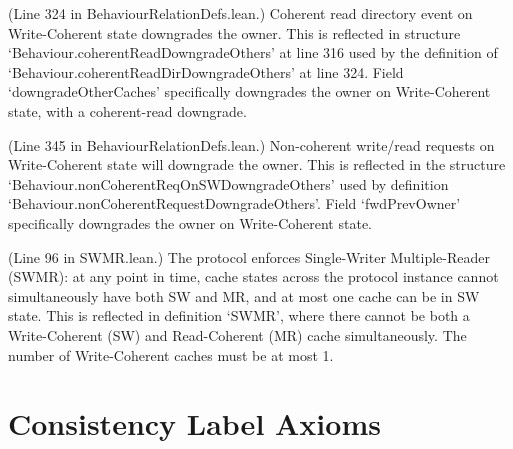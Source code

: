 \begin{definition}
  \label{def:coherentReadDirDowngradeOthers}
  \leanok
  (Line 324 in BehaviourRelationDefs.lean.)
  Coherent read directory event on Write-Coherent state downgrades the owner.
  This is reflected in structure `Behaviour.coherentReadDowngradeOthers' at line 316 used by
  the definition of `Behaviour.coherentReadDirDowngradeOthers' at line 324.
  Field `downgradeOtherCaches' specifically downgrades the owner on Write-Coherent state,
  with a coherent-read downgrade.
\end{definition}

\begin{definition}
  \label{def:nonCoherentRequestDowngradeOthers}
  \leanok
  (Line 345 in BehaviourRelationDefs.lean.)
  Non-coherent write/read requests on Write-Coherent state will downgrade the owner.
  This is reflected in the structure `Behaviour.nonCoherentReqOnSWDowngradeOthers'
  used by definition `Behaviour.nonCoherentRequestDowngradeOthers'.
  Field `fwdPrevOwner' specifically downgrades the owner on Write-Coherent state.
\end{definition}

\begin{definition}
  \label{def:SWMR_wrapper}
  \leanok
  (Line 96 in SWMR.lean.)
  The protocol enforces Single-Writer Multiple-Reader (SWMR):
  at any point in time, cache states across the protocol instance
  cannot simultaneously have both SW and MR, and at most one cache
  can be in SW state.
  This is reflected in definition `SWMR', where there cannot be both a Write-Coherent (SW)
  and Read-Coherent (MR) cache simultaneously. The number of Write-Coherent caches must be at most 1.
\end{definition}

\section{Consistency Label Axioms}
\label{sec:axioms:consistency-labels}

